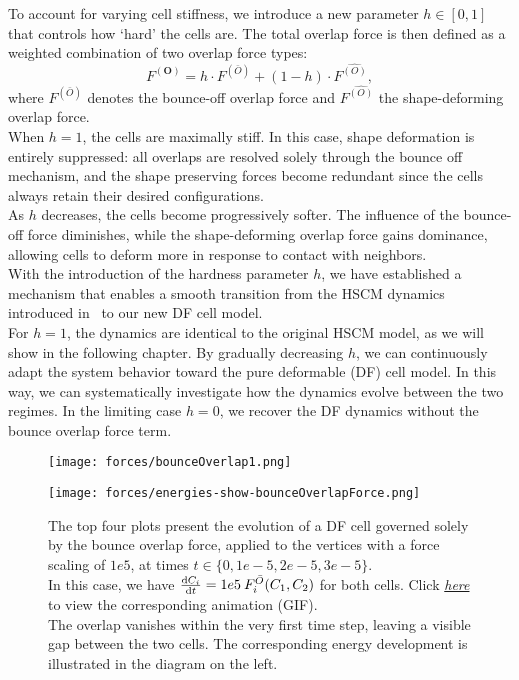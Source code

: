 To account for varying cell stiffness, we introduce a new parameter $h \in [0, 1]$ that controls how `hard' the cells are. 
The total overlap force is then defined as a weighted combination of two overlap force types:
\[
F^{(\mathbf{O})} = h \cdot F^{(\bar{O})} + (1 - h) \cdot F^{\hat{(O)}},
\]
where $F^{(\bar{O})}$ denotes the bounce-off overlap force and $F^{\hat{(O)}}$ the shape-deforming overlap force.\\
When $h = 1$, the cells are maximally stiff. 
In this case, shape deformation is entirely suppressed: all overlaps are resolved solely through the bounce off mechanism, and the shape preserving forces become redundant since the cells always retain their desired configurations. \\
As $h$ decreases, the cells become progressively softer. 
The influence of the bounce-off force diminishes, while the shape-deforming overlap force gains dominance, allowing cells to deform more in response to contact with neighbors. \\
With the introduction of the hardness parameter $h$, we have established a mechanism that enables a smooth transition from the HSCM dynamics introduced in~\cite{Bruna2012} to our new DF cell model. \\
For $h = 1$, the dynamics are identical to the original HSCM model, as we will show in the following chapter. 
By gradually decreasing $h$, we can continuously adapt the system behavior toward the pure deformable (DF) cell model. 
In this way, we can systematically investigate how the dynamics evolve between the two regimes. 
In the limiting case $h = 0$, we recover the DF dynamics without the bounce overlap force term.

\begin{figure}[htbp]
	\centering
	\texttt{[image: forces/bounceOverlap1.png]}\\[1ex]
	\begin{minipage}[c]{0.35\textwidth}
		\texttt{[image: forces/energies-show-bounceOverlapForce.png]}
	\end{minipage}\hfill
	\begin{minipage}[c]{0.6\textwidth}
		\caption{
			The top four plots present the evolution of a DF cell governed solely by the bounce overlap force, applied to the vertices with a force scaling of $1e5$, at times $t \in \{0, 1e-5, 2e-5, 3e-5\}$.\\
			In this case, we have $\frac{\mathrm{d} C_i}{\mathrm{d} t} = 1e5 \: F_i^{\bar{O}}(C_1, C_2)$ for both cells.
			Click \href{https://github.com/tivo476c/FlexibleCellModel/blob/master/figures/gifs/showForces/show-bounceOverlapForce.gif}{\textit{here}} to view the corresponding animation (GIF).\\
			The overlap vanishes within the very first time step, leaving a visible gap between the two cells. The corresponding energy development is illustrated in the diagram on the left.
		}
		\label{fig:bounceOverlapForce}
	\end{minipage}
\end{figure}



